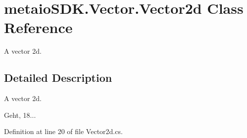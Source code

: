 \section{metaio\-S\-D\-K.\-Vector.\-Vector2d Class Reference}
\label{classmetaio_s_d_k_1_1_vector_1_1_vector2d}


A vector 2d.  




\subsection{Detailed Description}
A vector 2d. 

Geht, 18... 

Definition at line 20 of file Vector2d.\-cs.

